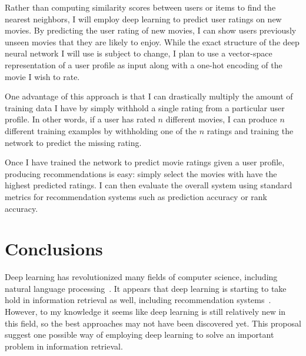 \documentclass[12pt]{article}
\begin{document}
Rather than computing similarity scores between users or items to find the
nearest neighbors, I will employ deep learning to predict user ratings on new
movies.
By predicting the user rating of new movies, I can show users previously
unseen movies that they are likely to enjoy.
While the exact structure of the deep neural network I will use is subject to
change, I plan to use a vector-space representation of a user profile as input
along with a one-hot encoding of the movie I wish to rate.

One advantage of this approach is that I can drastically multiply the amount
of training data I have by simply withhold a single rating from a particular
user profile.
In other words, if a user has rated $n$ different movies, I can produce $n$
different training examples by withholding one of the $n$ ratings and training
the network to predict the missing rating.

Once I have trained the network to predict movie ratings given a user profile,
producing recommendations is easy: simply select the movies with have the
highest predicted ratings. I can then evaluate the overall system using
standard metrics for recommendation systems such as prediction accuracy or
rank accuracy.

\section{Conclusions}

Deep learning has revolutionized many fields of computer science, including
natural language processing~\cite{deep-survey}.
It appears that deep learning is starting to take hold in information
retrieval as well, including recommendation systems~\cite{deep-cf}.
However, to my knowledge it seems like deep learning is still relatively new
in this field, so the best approaches may not have been discovered yet.
This proposal suggest one possible way of employing deep learning to solve an
important problem in information retrieval.



\end{document}
